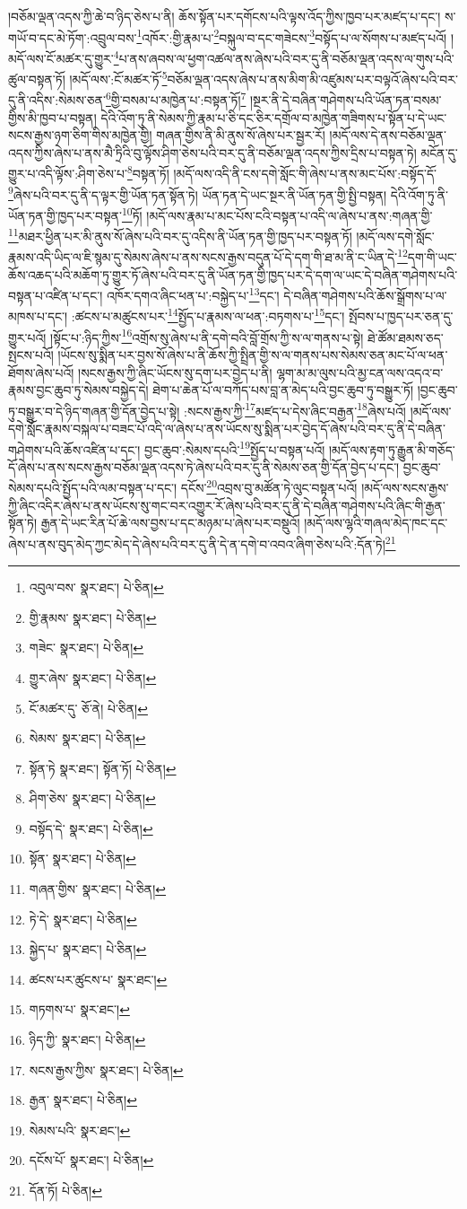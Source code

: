།བཅོམ་ལྡན་འདས་ཀྱི་ཆེ་བ་ཉིད་ཅེས་པ་ནི། ཆོས་སྟོན་པར་དགོངས་པའི་ལྟས་འོད་ཀྱིས་ཁྱབ་པར་མཛད་པ་དང་། ས་གཡོ་བ་དང་མེ་ཏོག་:འབྲུལ་བས་\footnote{འབུལ་བས་  སྣར་ཐང་།  པེ་ཅིན། }འཁོར་:གྱི་རྣམ་པ་\footnote{གྱི་རྣམས་  སྣར་ཐང་།  པེ་ཅིན། }བསྐུལ་བ་དང་གཟེངས་\footnote{གཟེང་  སྣར་ཐང་།  པེ་ཅིན། }བསྟོད་པ་ལ་སོགས་པ་མཛད་པའོ། །མདོ་ལས་ངོ་མཚར་དུ་གྱུར་\footnote{གྱུར་ཞེས་  སྣར་ཐང་།  པེ་ཅིན། }པ་ནས་ཞབས་ལ་ཕྱག་འཚལ་ནས་ཞེས་པའི་བར་དུ་ནི་བཅོམ་ལྡན་འདས་ལ་གུས་པའི་ཚུལ་བསྟན་ཏོ། །མདོ་ལས་:ངོ་མཚར་ཏོ་\footnote{ངོ་མཚར་དུ་  ཅོ་ནེ།  པེ་ཅིན། }བཅོམ་ལྡན་འདས་ཞེས་པ་ནས་མིག་མི་འཛུམས་པར་བལྟའོ་ཞེས་པའི་བར་དུ་ནི་འདིས་:སེམས་ཅན་\footnote{སེམས་  སྣར་ཐང་།  པེ་ཅིན། }གྱི་བསམ་པ་མཁྱེན་པ་:བསྟན་ཏོ།\footnote{སྟོན་ཏེ  སྣར་ཐང་། སྟོན་ཏོ།  པེ་ཅིན། } །སྔར་ནི་དེ་བཞིན་གཤེགས་པའི་ཡོན་ཏན་བསམ་གྱིས་མི་ཁྱབ་པ་བསྟན། དེའི་འོག་ཏུ་ནི་སེམས་ཀྱི་རྣམ་པ་ཅི་དང་ཅིར་དགྲོལ་བ་མཁྱེན་གཟིགས་པ་སྟོན་པ་དེ་ཡང་སངས་རྒྱས་ཉག་ཅིག་གིས་མཁྱེན་གྱི། གཞན་གྱིས་ནི་མི་ནུས་སོ་ཞེས་པར་སྦྱར་རོ། །མདོ་ལས་དེ་ནས་བཅོམ་ལྡན་འདས་ཀྱིས་ཞེས་པ་ནས་མཻ་ཏྲིའི་བུ་ལྟོས་ཤིག་ཅེས་པའི་བར་དུ་ནི་བཅོམ་ལྡན་འདས་ཀྱིས་དྲིས་པ་བསྟན་ཏེ། མངོན་དུ་གྱུར་པ་འདི་ལྟོས་:ཤིག་ཅེས་པ་\footnote{ཤིག་ཅེས་  སྣར་ཐང་།  པེ་ཅིན། }བསྟན་ཏོ། །མདོ་ལས་འདི་ནི་ངས་དགེ་སློང་གི་ཞེས་པ་ནས་མང་པོས་:བསྟོད་དོ་\footnote{བསྟོད་དེ་  སྣར་ཐང་།  པེ་ཅིན། }ཞེས་པའི་བར་དུ་ནི་ད་ལྟར་གྱི་ཡོན་ཏན་སྟོན་ཏེ། ཡོན་ཏན་དེ་ཡང་སྔར་ནི་ཡོན་ཏན་གྱི་སྤྱི་བསྟན། དེའི་འོག་ཏུ་ནི་ཡོན་ཏན་གྱི་ཁྱད་པར་བསྟན་\footnote{སྟོན་  སྣར་ཐང་།  པེ་ཅིན། }ཏོ། །མདོ་ལས་རྣམ་པ་མང་པོས་ངའི་བསྟན་པ་འདི་ལ་ཞེས་པ་ནས་:གཞན་གྱི་\footnote{གཞན་གྱིས་  སྣར་ཐང་།  པེ་ཅིན། }མཐར་ཕྱིན་པར་མི་ནུས་སོ་ཞེས་པའི་བར་དུ་འདིས་ནི་ཡོན་ཏན་གྱི་ཁྱད་པར་བསྟན་ཏོ། །མདོ་ལས་དགེ་སློང་རྣམས་འདི་ཡིད་ལ་ཇི་སྙམ་དུ་སེམས་ཞེས་པ་ནས་སངས་རྒྱས་བདུན་པོ་དེ་དག་གི་ཐ་མ་ནི་ང་ཡིན་དེ་\footnote{ཏེ་དེ་  སྣར་ཐང་།  པེ་ཅིན། }དག་གི་ཡང་ཆོས་འཆད་པའི་མཆོག་ཏུ་གྱུར་ཏོ་ཞེས་པའི་བར་དུ་ནི་ཡོན་ཏན་གྱི་ཁྱད་པར་དེ་དག་ལ་ཡང་དེ་བཞིན་གཤེགས་པའི་བསྟན་པ་འཛིན་པ་དང་། འཁོར་དགའ་ཞིང་ཕན་པ་:བསྐྱེད་པ་\footnote{སྐྱེད་པ་  སྣར་ཐང་།  པེ་ཅིན། }དང་། དེ་བཞིན་གཤེགས་པའི་ཆོས་སྒྲོགས་པ་ལ་མཁས་པ་དང་། :ཚངས་པ་མཚུངས་པར་\footnote{ཚངས་པར་ཚུངས་པ་  སྣར་ཐང་། }སྤྱོད་པ་རྣམས་ལ་ཕན་:བཏགས་པ་\footnote{གཏགས་པ་  སྣར་ཐང་། }དང་། སྤོབས་པ་ཁྱད་པར་ཅན་དུ་གྱུར་པའོ། །སྟོང་པ་:ཉིད་ཀྱིས་\footnote{ཉིད་ཀྱི་  སྣར་ཐང་།  པེ་ཅིན། }འགྲོས་སུ་ཞེས་པ་ནི་དགེ་བའི་བློ་གྲོས་ཀྱི་ས་ལ་གནས་པ་སྟེ། ཐེ་ཚོམ་ཐམས་ཅད་སྤངས་པའོ། །ཡོངས་སུ་སྨིན་པར་བྱས་སོ་ཞེས་པ་ནི་ཆོས་ཀྱི་སྤྲིན་གྱི་ས་ལ་གནས་པས་སེམས་ཅན་མང་པོ་ལ་ཕན་ཐོགས་ཞེས་པའོ། །སངས་རྒྱས་ཀྱི་ཞིང་ཡོངས་སུ་དག་པར་བྱེད་པ་ནི། ལྷག་མ་མ་ལུས་པའི་མྱ་ངན་ལས་འདའ་བ་རྣམས་བྱང་ཆུབ་ཏུ་སེམས་བསྐྱེད་དེ། ཐེག་པ་ཆེན་པོ་ལ་བཀོད་པས་བླ་ན་མེད་པའི་བྱང་ཆུབ་ཏུ་བསྒྱུར་ཏོ། །བྱང་ཆུབ་ཏུ་བསྒྱུར་བ་དེ་ཉིད་གཞན་གྱི་དོན་བྱེད་པ་སྟེ། :སངས་རྒྱས་ཀྱི་\footnote{སངས་རྒྱས་ཀྱིས་  སྣར་ཐང་།  པེ་ཅིན། }མཛད་པ་དེས་ཞིང་བརྒྱན་\footnote{རྒྱན་  སྣར་ཐང་།  པེ་ཅིན། }ཞེས་པའོ། །མདོ་ལས་དགེ་སློང་རྣམས་བསྐལ་པ་བཟང་པོ་འདི་ལ་ཞེས་པ་ནས་ཡོངས་སུ་སྨིན་པར་བྱེད་དོ་ཞེས་པའི་བར་དུ་ནི་དེ་བཞིན་གཤེགས་པའི་ཆོས་འཛིན་པ་དང་། བྱང་ཆུབ་:སེམས་དཔའི་\footnote{སེམས་པའི་  སྣར་ཐང་། }སྤྱོད་པ་བསྟན་པའོ། །མདོ་ལས་རྟག་ཏུ་རྒྱུན་མི་གཅོད་དོ་ཞེས་པ་ནས་སངས་རྒྱས་བཅོམ་ལྡན་འདས་ཏེ་ཞེས་པའི་བར་དུ་ནི་སེམས་ཅན་གྱི་དོན་བྱེད་པ་དང་། བྱང་ཆུབ་སེམས་དཔའི་སྤྱོད་པའི་ལམ་བསྟན་པ་དང་། དངོས་\footnote{དངོས་པོ་  སྣར་ཐང་།  པེ་ཅིན། }འབྲས་བུ་མཚོན་ཏེ་ལུང་བསྟན་པའོ། །མདོ་ལས་སངས་རྒྱས་ཀྱི་ཞིང་འདིར་ཞེས་པ་ནས་ཡོངས་སུ་གང་བར་འགྱུར་རོ་ཞེས་པའི་བར་དུ་ནི་དེ་བཞིན་གཤེགས་པའི་ཞིང་གི་རྒྱན་སྟོན་ཏེ། རྒྱན་དེ་ཡང་རིན་པོ་ཆེ་ལས་བྱས་པ་དང་མཉམ་པ་ཞེས་པར་བསྡུའོ། །མདོ་ལས་ལྷའི་གཞལ་མེད་ཁང་དང་ཞེས་པ་ནས་བུད་མེད་ཀྱང་མེད་དེ་ཞེས་པའི་བར་དུ་ནི་དེ་ན་དགེ་བ་འབའ་ཞིག་ཅེས་པའི་:དོན་ཏེ།\footnote{དོན་ཏོ།  པེ་ཅིན། } 